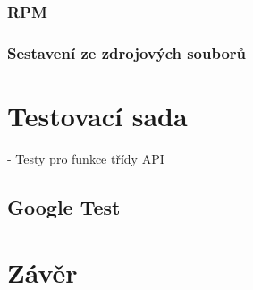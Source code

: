 \subsection{RPM} %
\subsection{Sestavení ze zdrojových souborů}

\chapter{Testovací sada}

- Testy pro funkce třídy API

\section{Google Test}

\chapter{Závěr}



